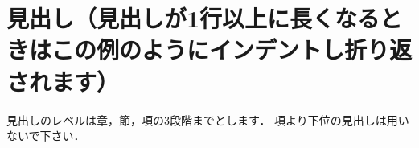\documentclass[main.tex]{subfiles}
\begin{document}
\section{見出し（見出しが1行以上に長くなるときはこの例のようにインデントし折り返されます）}
見出しのレベルは章，節，項の3段階までとします．
項より下位の見出しは用いないで下さい．\cite{Coase-1937-NatureFirm}

\ifSubfilesClassLoaded{
  \raggedend%
  
  
}{}
\end{document}
